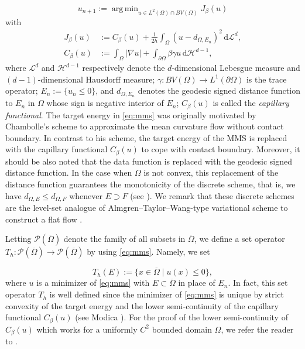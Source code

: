 \documentclass[11pt]{article}
\numberwithin{equation}{section}
\newcommand{\pOmega}[0]{\partial\Omega}
\newcommand{\closure}[1]{\overline{#1}}
\DeclareMathOperator*{\argmin}{arg\,min}
\def\le{\leqslant}
\begin{document}
\begin{equation}
\label{eq:mms}
u_{n+1} := \argmin_{u\in L^2(\Omega)\cap BV(\Omega)} J_\beta(u)
\end{equation}
with
\begin{align*}
J_\beta(u) &:= C_\beta(u) + \frac{1}{2h}\int_\Omega(u - d_{\Omega,E_n})^2\,\mathrm{d}\mathcal{L}^d,\\
C_\beta(u) &:= \int_\Omega |\nabla u| + \int_{\partial\Omega}\beta\gamma u\,\mathrm{d}\mathcal{H}^{d-1},
\end{align*}
where $\mathcal{L}^d$ and $\mathcal{H}^{d-1}$ respectively denote the $d$-dimensional Lebesgue measure and $(d-1)$-dimensional Hausdorff measure; $\gamma:BV(\Omega)\to L^1(\pOmega)$ is the trace operator; $E_n := \{u_n \le 0\}$, and $d_{\Omega,E_n}$ denotes the geodesic signed distance function to $E_n$ in $\Omega$ whose sign is negative interior of $E_n$;
$C_\beta(u)$ is called the \textit{capillary functional}. The target energy in \eqref{eq:mms} was originally motivated by Chambolle's scheme \cite{Chambolle04} to approximate the mean curvature flow without contact boundary. In contrast to his scheme, the target energy of the MMS is replaced with the capillary functional $C_\beta(u)$ to cope with contact boundary. Moreover, it should be also noted that the data function is replaced with the geodesic signed distance function. In the case when $\Omega$ is not convex, this replacement of the distance function guarantees the monotonicity of the discrete scheme, that is, we have $d_{\Omega,E} \le d_{\Omega,F}$ whenever $E \supset F$ (see \cite[Lemma 3.5]{EG25}). We remark that these discrete schemes are the level-set analogue of Almgren--Taylor--Wang-type variational scheme to construct a flat flow \cite{Almgren93}.

Letting $\mathcal{P}(\closure{\Omega})$ denote the family of all subsets in $\closure{\Omega}$, we define a set operator $T_h:\mathcal{P}(\closure{\Omega})\to \mathcal{P}(\closure{\Omega})$ by using \eqref{eq:mms}. Namely, we set

\begin{equation}
    \label{eq:def-Th}
T_h(E) := \{x\in\overline{\Omega}\mid u(x)\le 0\},
\end{equation}
where $u$ is a minimizer of \eqref{eq:mms} with $E\subset\closure{\Omega}$ in place of $E_n$. In fact, this set operator $T_h$ is well defined since the minimizer of \eqref{eq:mms} is unique by strict convexity of the target energy and the lower semi-continuity of the capillary functional $C_\beta(u)$ (see Modica \cite{Modica87}).
For the proof of the lower semi-continuity of $C_\beta(u)$ which works for a uniformly $C^2$ bounded domain $\Omega$, we refer the reader to \cite[Proposition 4]{EG24}.
\end{document}

